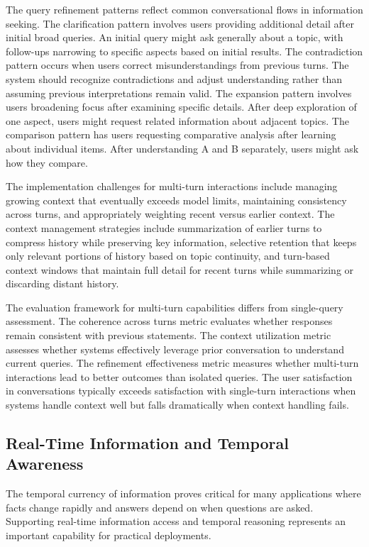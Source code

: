 The query refinement patterns reflect common conversational flows in information seeking. The clarification pattern involves users providing additional detail after initial broad queries. An initial query might ask generally about a topic, with follow-ups narrowing to specific aspects based on initial results. The contradiction pattern occurs when users correct misunderstandings from previous turns. The system should recognize contradictions and adjust understanding rather than assuming previous interpretations remain valid. The expansion pattern involves users broadening focus after examining specific details. After deep exploration of one aspect, users might request related information about adjacent topics. The comparison pattern has users requesting comparative analysis after learning about individual items. After understanding A and B separately, users might ask how they compare.

The implementation challenges for multi-turn interactions include managing growing context that eventually exceeds model limits, maintaining consistency across turns, and appropriately weighting recent versus earlier context. The context management strategies include summarization of earlier turns to compress history while preserving key information, selective retention that keeps only relevant portions of history based on topic continuity, and turn-based context windows that maintain full detail for recent turns while summarizing or discarding distant history.

The evaluation framework for multi-turn capabilities differs from single-query assessment. The coherence across turns metric evaluates whether responses remain consistent with previous statements. The context utilization metric assesses whether systems effectively leverage prior conversation to understand current queries. The refinement effectiveness metric measures whether multi-turn interactions lead to better outcomes than isolated queries. The user satisfaction in conversations typically exceeds satisfaction with single-turn interactions when systems handle context well but falls dramatically when context handling fails.

\subsection{Real-Time Information and Temporal Awareness}

The temporal currency of information proves critical for many applications where facts change rapidly and answers depend on when questions are asked. Supporting real-time information access and temporal reasoning represents an important capability for practical deployments.

